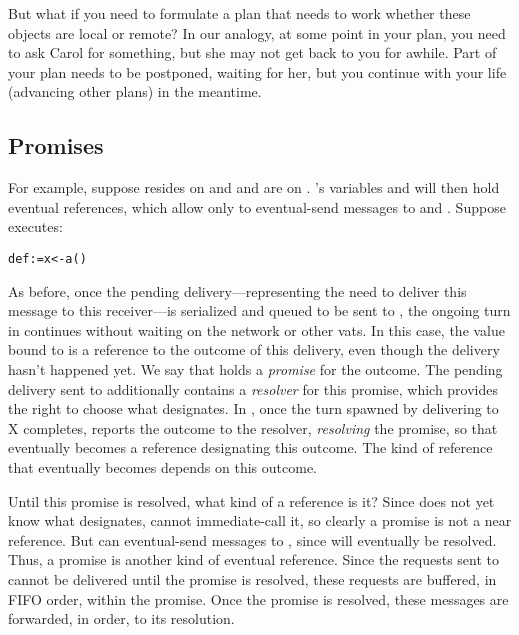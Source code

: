 \documentclass{llncs}
\begin{document}
But what if you need to formulate a plan that needs to work whether
these objects are local or remote? In our analogy,  at some point in your plan, you need to ask Carol for
something, but she may not get back to you for awhile. Part of your
plan needs to be postponed, waiting for her, but you continue with
your life (advancing other plans) in the meantime.

\subsection{Promises}

For example, suppose  resides on  and  and
 are on . 's variables  and  will
then hold eventual references, which allow  only to
eventual-send messages to  and . Suppose 
executes:
%
\begin{alltt}
    def  := x <- a()
\end{alltt}
%
As before, once the pending delivery---representing the need to
deliver this message to this receiver---is serialized and
queued to be sent to , the ongoing turn in  continues
without waiting on the network or other vats. In this case, the value
bound to  is a reference to the outcome of this delivery, even
though the delivery hasn't happened yet. We say that  holds a
\emph{promise} for the outcome. The pending delivery sent to 
additionally contains a \emph{resolver} for this promise, which
provides the right to choose what  designates. In ,
once the turn spawned by delivering  to X completes, 
reports the outcome to the resolver, \emph{resolving} the promise, so
that  eventually becomes a reference designating this
outcome. The kind of reference that  eventually becomes
depends on this outcome.

Until this promise is resolved, what kind of a reference is it? Since
 does not yet know what  designates,  cannot
immediate-call it, so clearly a promise is not a near reference. But
 can eventual-send messages to , since  will
eventually be resolved.  Thus, a promise is another kind of eventual
reference. Since the requests sent to  cannot be delivered
until the promise is resolved, these requests are buffered, in FIFO
order, within the promise. Once the promise is resolved, these
messages are forwarded, in order, to its resolution.
\end{document}
